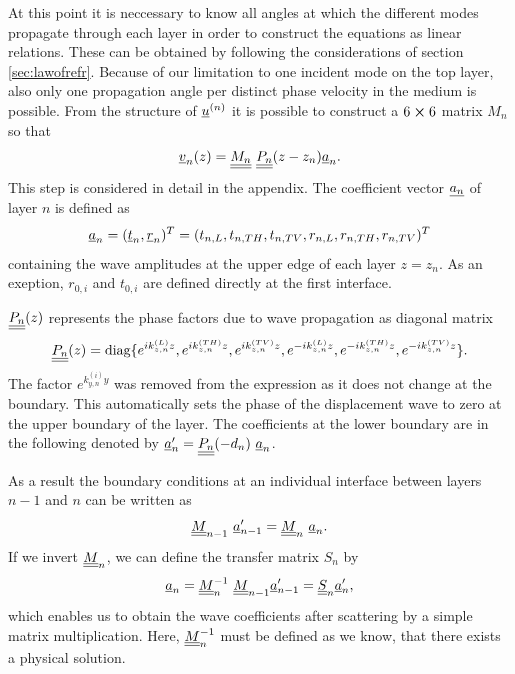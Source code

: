 At this point it is neccessary to know all angles at which the different modes
propagate through each layer in order to construct the equations as linear
relations. These can be obtained by following the considerations of section
\ref{sec:lawofrefr}.  Because of our limitation to one incident mode on the top
layer, also only one propagation angle per distinct phase velocity in the
medium is possible. From the structure of
$\underline{u}^{(n)}$ it is possible to construct a $6\cross6$ matrix $M_n$ so that
\begin{equation} \label{eq:statevector}
    \underline{v}_n(z) = \underline{\underline{M_n}}\ \underline{\underline{P_n}}(z-z_n)\underline{a}_n .
\end{equation} 
This step is considered in detail in the appendix. The coefficient vector
$\underline{a_n}$ of layer $n$ is defined as
\begin{equation}
    \underline{a}_n = (\underline{t}_n, \underline{r}_n)^T	= (t_{n,L}, t_{n,TH}, t_{n,TV},
    r_{n,L}, r_{n,TH}, r_{n,TV})^T
\end{equation}
containing the wave amplitudes at the upper edge of each layer $z = z_n$. As an
exeption, $r_{0,i}$ and $t_{0,i}$ are defined directly at the first interface.

$\underline{\underline{P_n}}(z)$ represents the phase factors due to wave propagation
as diagonal matrix
\begin{equation} \label{eq:PmatTMM}
    \underline{\underline{P_n}}(z) = \text{diag}\{ e^{ik_{z,n}^{(L)}z},
    e^{ik_{z,n}^{(TH)}z},
    e^{ik_{z,n}^{(TV)}z}, e^{-ik_{z,n}^{(L)}z}, e^{-ik_{z,n}^{(TH)}z},
    e^{-ik_{z,n}^{(TV)}z}\}.
\end{equation}
The factor $e^{k_{y,n}^{(i)} y}$ was removed from the expression as it does not
change at the boundary. This automatically sets the phase of the displacement
wave to zero at the upper boundary of the layer. The coefficients at the lower
boundary are in the following denoted by $\underline{a}_n^\prime =
    \underline{\underline{P_n}}(-d_n)\ \underline{a}_n$.

As a result the boundary conditions at an individual interface between layers
$n-1$ and $n$ can be written as
\begin{equation}
    \uuline{M}_{n-1}\ \uline{a}_{n-1}^\prime = \uuline{M}_{n}\ \uline{a}_{n}.
\end{equation}
If we invert $\underline{\underline{M}}_{n}$, we can define the
transfer matrix $S_n$ by
\begin{equation} \label{eq:defSn}
    \underline{a}_{n} = \underline{\underline{M}}_{n}^{-1}\ \underline{\underline{M}}_{n-1}
    \underline{a}_{n-1}^\prime
    = \underline{\underline{S}}_n \underline{a}_n^\prime,
\end{equation}
which enables us to obtain the wave coefficients after scattering by a simple
matrix multiplication. Here, $\underline{\underline{M}}_{n}^{-1}$ must be defined as we know,
that there exists a physical solution.

